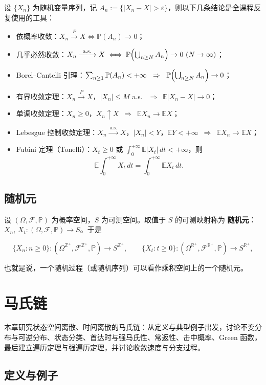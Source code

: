 \documentclass[lang=cn,10pt,newtx,thmcnt=chapter,mode=simple]{vividbook}
\providecommand{\R}{}\renewcommand{\R}{\mathbb{R}}
\providecommand{\Z}{}\renewcommand{\Z}{\mathbb{Z}}
\providecommand{\E}{}\renewcommand{\E}{\mathbb{E}}
\providecommand{\Pp}{}\renewcommand{\Pp}{\mathbb{P}}
\newcommand{\darr}{\;\Rightarrow\;}
\newcommand{\chapterheadfix}[1]{\vspace*{1.2cm}\markboth{\xchaptertitle\ #1}{}}
\theoremstyle{vividthm}
\theoremstyle{vividdef}
\theoremstyle{vividexa}
\theoremstyle{vividrem}
\begin{document}
设 $\{X_n\}$ 为随机变量序列，记 $A_n:=\{|X_n-X|>\varepsilon\}$，则以下几条结论是全课程反复使用的工具：
\begin{itemize}
  \item 依概率收敛：$X_n\xrightarrow{\ P\ }X\iff \Pp(A_n)\to 0$；
  \item 几乎必然收敛：$X_n\xrightarrow{\ \mathrm{a.s.}\ }X\iff \Pp\Bigl(\bigcup_{n\ge N}A_n\Bigr)\to 0\ (N\to\infty)$；
  \item Borel--Cantelli 引理：$\sum_{n\ge1}\Pp(A_n)<+\infty\ \darr\ \Pp\Bigl(\bigcup_{n\ge N}A_n\Bigr)\to 0$；
  \item 有界收敛定理：$X_n\xrightarrow{\ P\ }X$，$|X_n|\le M$ a.s.\ $\darr\ \E|X_n-X|\to 0$；
  \item 单调收敛定理：$X_n\ge 0$，$X_n\uparrow X\ \darr\ \E X_n\to\E X$；
  \item Lebesgue 控制收敛定理：$X_n\xrightarrow{\ \mathrm{a.s.}\ }X$，$|X_n|<Y$，$\E Y<+\infty\ \darr\ \E X_n\to\E X$；
  \item Fubini 定理（Tonelli）：$X_t\ge0$ 或 $\int_0^{+\infty}\E|X_t|\,dt<+\infty$，则
  \[
    \E\int_0^{+\infty}X_t\,dt=\int_0^{+\infty}\E X_t\,dt.
  \]
\end{itemize}

\section{随机元}

设 $(\Omega,\mathcal{F},\Pp)$ 为概率空间，$S$ 为可测空间。取值于 $S$ 的可测映射称为
\textbf{随机元}：$X_n,\,X_t:(\Omega,\mathcal{F},\Pp)\to S$。于是

\[
\{X_n:n\ge0\}:(\Omega^{\Z^+},\mathcal{F}^{\Z^+},\Pp)\to S^{\Z^+},
\qquad
\{X_t:t\ge0\}:(\Omega^{\R^+},\mathcal{F}^{\R^+},\Pp)\to S^{\R^+},
\]

也就是说，一个随机过程（或随机序列）可以看作乘积空间上的一个随机元。

\chapter{马氏链}
\chapterheadfix{马氏链}

本章研究状态空间离散、时间离散的马氏链：从定义与典型例子出发，讨论不变分布与可逆分布、状态分类、首达时与强马氏性、常返性、击中概率、Green 函数，最后建立遍历定理与强遍历定理，并讨论收敛速度与分支过程。

\section{定义与例子}
\end{document}
